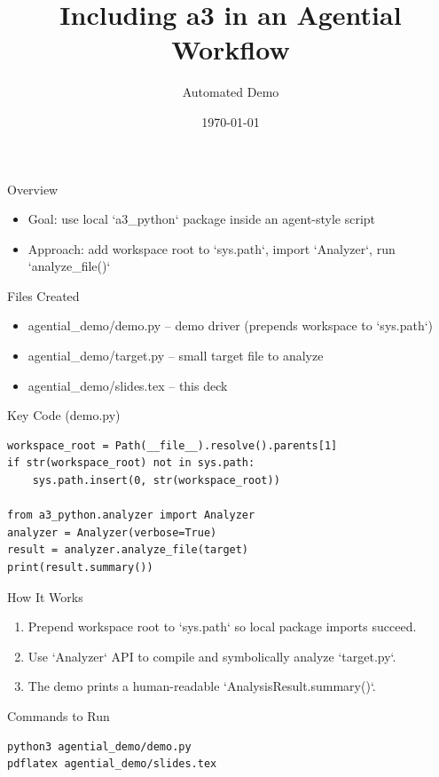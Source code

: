 \documentclass{beamer}
\title{Including a3 in an Agential Workflow}
\author{Automated Demo}
\date{\today}
\begin{document}
\begin{frame}\titlepage\end{frame}

\begin{frame}{Overview}
\begin{itemize}
  \item Goal: use local `a3_python` package inside an agent-style script
  \item Approach: add workspace root to `sys.path`, import `Analyzer`, run `analyze_file()`
\end{itemize}
\end{frame}

\begin{frame}{Files Created}
\begin{itemize}
  \item agential_demo/demo.py -- demo driver (prepends workspace to `sys.path`)
  \item agential_demo/target.py -- small target file to analyze
  \item agential_demo/slides.tex -- this deck
\end{itemize}
\end{frame}

\begin{frame}[fragile]{Key Code (demo.py)}
\begin{verbatim}
workspace_root = Path(__file__).resolve().parents[1]
if str(workspace_root) not in sys.path:
    sys.path.insert(0, str(workspace_root))

from a3_python.analyzer import Analyzer
analyzer = Analyzer(verbose=True)
result = analyzer.analyze_file(target)
print(result.summary())
\end{verbatim}
\end{frame}

\begin{frame}{How It Works}
\begin{enumerate}
  \item Prepend workspace root to `sys.path` so local package imports succeed.
  \item Use `Analyzer` API to compile and symbolically analyze `target.py`.
  \item The demo prints a human-readable `AnalysisResult.summary()`.
\end{enumerate}
\end{frame}

\begin{frame}{Commands to Run}
\begin{verbatim}
python3 agential_demo/demo.py
pdflatex agential_demo/slides.tex
\end{verbatim}
\end{frame}
\end{document}
